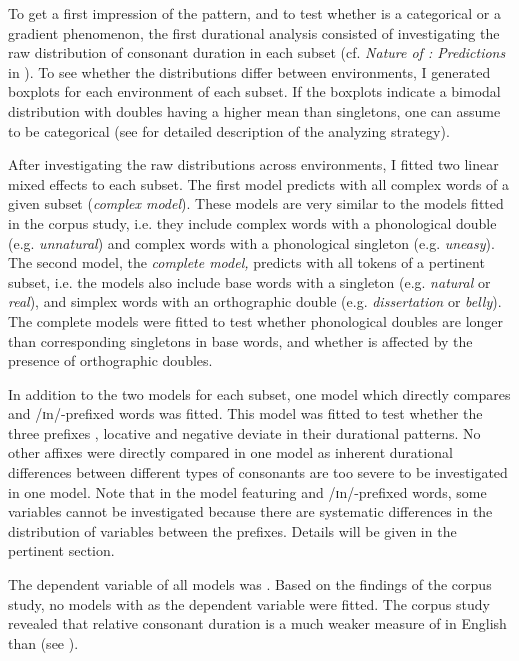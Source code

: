 To get a first impression of the  pattern, and to test whether  is a categorical or a gradient phenomenon, the first durational analysis consisted of investigating the raw distribution of consonant duration in each subset (cf. \textit{Nature of : Predictions }in ). To see whether the distributions differ between environments, I generated boxplots for each environment of each subset. 
If the boxplots indicate a bimodal distribution with doubles having a higher mean than singletons, one can assume  to be categorical (see  for detailed description of the analyzing strategy). 

After investigating the raw distributions across environments, I fitted two linear mixed effects  to each subset. 
The first model predicts  with all complex words of a given subset (\textit{complex model}). These models are very similar to the models fitted in the corpus study, i.e. they include complex words with a phonological double (e.g. \textit{unnatural}) and complex words with a phonological singleton (e.g. \textit{uneasy}). 
The second model, the \textit{complete model,} predicts  with all tokens of a pertinent subset, i.e. the models also include base words with a singleton (e.g. \textit{natural} or \textit{real}), and simplex words with an orthographic double (e.g. \textit{dissertation} or \textit{belly}). The complete models were fitted to test whether phonological doubles are longer than corresponding singletons in base words, and whether  is affected by the presence of orthographic doubles. 

In addition to the two models for each subset, one model which directly compares  and /ɪn/-prefixed words was fitted. This model was fitted to test whether the three prefixes , locative  and negative  deviate in their durational patterns. No other affixes were directly compared in one model as inherent durational differences between different types of consonants are too severe to be investigated in one model. Note that in the model featuring  and /ɪn/-prefixed words, some variables cannot be investigated because there are systematic differences in the distribution of variables between the prefixes. Details will be given in the pertinent section.


The dependent variable of all models was . Based on the findings of the corpus study, no models with  as the dependent variable were fitted.  The corpus study revealed that relative consonant duration is a much weaker measure of  in English than  (see ).

